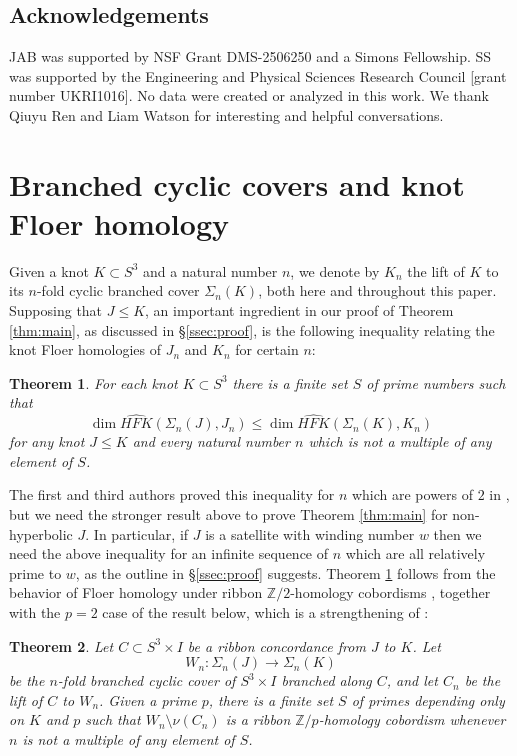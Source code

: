 \documentclass[11pt]{amsart}
\newtheorem {theorem}{Theorem}
\numberwithin{equation}{section}
\numberwithin{theorem}{section}
\theoremstyle{definition}
\newcommand{\Z}{\mathbb{Z}}
\newcommand\HFK{\widehat{\mathit{HFK}}}
\begin{document}
\subsection{Acknowledgements}
JAB was supported by NSF Grant DMS-2506250 and a Simons Fellowship. SS was supported by the Engineering and Physical Sciences Research Council [grant number UKRI1016].  No data were created or analyzed in this work. We thank Qiuyu Ren and Liam Watson for interesting and helpful conversations.


%
%
%
%
%

\section{Branched cyclic covers and knot Floer homology} \label{sec:cyclic-covers}
\newcommand\resultant{\operatorname{Res}}

Given a knot $K\subset S^3$ and a natural number $n$, we denote by $K_n$ the lift of $K$ to its $n$-fold cyclic branched cover $\Sigma_n(K)$, both here and throughout this paper. Supposing that $J\leq K$, an important ingredient in our proof of Theorem \ref{thm:main}, as discussed in \S\ref{ssec:proof}, is the following inequality relating the knot Floer homologies of $J_n$ and $K_n$ for certain $n$:


\begin{theorem}
\label{thm:hfk-cover}
For each knot $K\subset S^3$ there is a finite set $S$ of prime numbers such that 
\[\dim \HFK(\Sigma_n(J),J_n) \leq \dim\HFK(\Sigma_n(K), K_n)\] for any knot $J\leq K$ and every natural number $n$ which is not a multiple of any element  of $S$.
\end{theorem}

The first and third authors proved this inequality for $n$ which are powers of $2$ in  \cite[Corollary 2.3]{bs-ribbon}, but we need the stronger result above to prove Theorem \ref{thm:main} for non-hyperbolic $J$.  In particular, if $J$ is a satellite with winding number $w$ then we need the above inequality for an infinite sequence of $n$ which are all relatively prime to $w$, as the outline in \S\ref{ssec:proof} suggests.  Theorem \ref{thm:hfk-cover} follows from the behavior of Floer homology under ribbon $\Z/2$-homology cobordisms  \cite{dlvvw}, together with the $p=2$ case of the result below, which is a strengthening of \cite[Lemma 2.2]{bs-ribbon}:

\begin{theorem} \label{thm:branched-cover-ribbon}
Let $C \subset S^3 \times I$ be a ribbon concordance from $J$ to $K$. Let \[W_n:\Sigma_n(J)\to\Sigma_n(K)\] be the $n$-fold branched cyclic cover of $S^3\times I$ branched along $C$, and let $C_n$ be the lift of $C$ to $W_n$.  Given a prime $p$, there is a finite set $S$ of primes depending only on $K$ and $p$ such that $W_n \setminus \nu(C_n)$ is a ribbon $\Z/p$-homology cobordism whenever $n$ is not a multiple of any element of  $S$.
\end{theorem}
\end{document}
